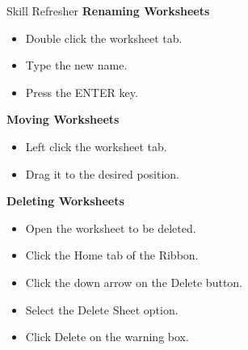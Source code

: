 \begin{center}
	\begin{sklbox}{Skill Refresher}
		\textbf{Renaming Worksheets}
		\\
		\begin{itemize}
			\setlength{\itemsep}{0pt}
			\setlength{\parskip}{0pt}
			\setlength{\parsep}{0pt}
			
			\item Double click the worksheet tab.
			\item Type the new name.
			\item Press the ENTER key.
		\end{itemize}

		\hfill \break
		\textbf{Moving Worksheets}
		\\
		\begin{itemize}
			\setlength{\itemsep}{0pt}
			\setlength{\parskip}{0pt}
			\setlength{\parsep}{0pt}
			
			\item Left click the worksheet tab.
			\item Drag it to the desired position.
		\end{itemize}

		\hfill \break
		\textbf{Deleting Worksheets}
		\\
		\begin{itemize}
			\setlength{\itemsep}{0pt}
			\setlength{\parskip}{0pt}
			\setlength{\parsep}{0pt}
			
			\item Open the worksheet to be deleted.
			\item Click the Home tab of the Ribbon.
			\item Click the down arrow on the Delete button.
			\item Select the Delete Sheet option.
			\item Click Delete on the warning box.
		\end{itemize}

	\end{sklbox}
\end{center}

